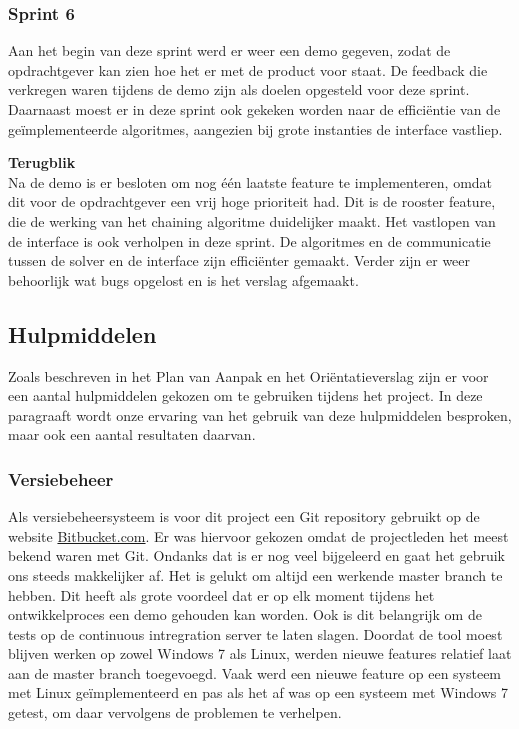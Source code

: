 \subsubsection{Sprint 6}
Aan het begin van deze sprint werd er weer een demo gegeven, zodat de opdrachtgever kan zien hoe het er met de product voor staat. De feedback die verkregen waren tijdens de demo zijn als doelen opgesteld voor deze sprint. Daarnaast moest er in deze sprint ook gekeken worden naar de effici\"entie van de ge\"implementeerde algoritmes, aangezien bij grote instanties de interface vastliep.

\textbf{Terugblik} \\
Na de demo is er besloten om nog \'e\'en laatste feature te implementeren, omdat dit voor de opdrachtgever een vrij hoge prioriteit had. Dit is de rooster feature, die de werking van het chaining algoritme duidelijker maakt. Het vastlopen van de interface is ook verholpen in deze sprint. De algoritmes en de communicatie tussen de solver en de interface zijn effici\"enter gemaakt. Verder zijn er weer behoorlijk wat bugs opgelost en is het verslag afgemaakt. 

\subsection{Hulpmiddelen}
Zoals beschreven in het Plan van Aanpak en het Ori\"entatieverslag zijn er voor een aantal hulpmiddelen gekozen om te gebruiken tijdens het project. In deze paragraaft wordt onze ervaring van het gebruik van deze hulpmiddelen besproken, maar ook een aantal resultaten daarvan. 

\subsubsection{Versiebeheer}
\label{subsec:versiebeheer}
Als versiebeheersysteem is voor dit project een Git repository gebruikt op de website \href{http://bitbucket.com}{Bitbucket.com}. Er was hiervoor gekozen omdat de projectleden het meest bekend waren met Git. Ondanks dat is er nog veel bijgeleerd en gaat het gebruik ons steeds makkelijker af. Het is gelukt om altijd een werkende master branch te hebben. Dit heeft als grote voordeel dat er op elk moment tijdens het ontwikkelproces een demo gehouden kan worden. Ook is dit belangrijk om de tests op de continuous intregration server te laten slagen. Doordat de tool moest blijven werken op zowel Windows 7 als Linux, werden nieuwe features relatief laat aan de master branch toegevoegd. Vaak werd een nieuwe feature op een systeem met Linux ge\"implementeerd en pas als het af was op een systeem met Windows 7 getest, om daar vervolgens de problemen te verhelpen.

